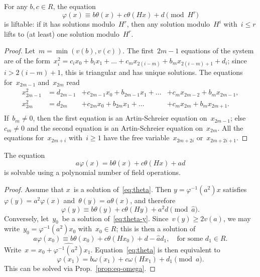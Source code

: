 \documentclass{llncs}
\begin{document}
\begin{proposition}\label{prop:eq-omega}
For any $b, c ∈ R$, the equation
\begin{equation}\label{eq:eq-omega}
φ(x) ≡ b θ(x) + c θ(Hx) + d \pmod{H^r}
\end{equation}
is liftable: if it has solutions modulo~$H^r$, then any solution
modulo~$H^i$ with~$i ≤ r$ lifts to (at least) one solution
modulo~$H^r$.
\end{proposition}


\begin{proof}
Let~$m = \min (v(b), v(c))$. The first~$2m-1$ equations of the system are
of the form~$x_i^2 = c_i x_0 + b_i x_1 + \dots + c_{m} x_{2(i-m)} +
b_m x_{2(i-m)+1} + d_i$; since~$i > 2(i-m)+1$, this is triangular and has
unique solutions. The equations for~$x_{2m-1}$ and~$x_{2m}$ read
\begin{equation}\label{eq:x2m}\begin{array}{llll}
x_{2m-1}^2 &= d_{2m-1} &+ c_{2m-1} x_0 + b_{2m-1} x_1 + \dots
  &+ c_{m} x_{2m-2} + b_{m} x_{2m-1},\\
x_{2m}^2 &= d_{2m} &+ c_{2m} x_0 + b_{2m} x_1 + \dots
  &+ c_{m} x_{2m} + b_{m} x_{2m+1}.\\
\end{array}\end{equation}
If~$b_m ≠ 0$, then the first equation is an Artin-Schreier equation
on~$x_{2m-1}$; else~$c_m ≠ 0$ and the second equation is an
Artin-Schreier equation on~$x_{2m}$. All the equations for~$x_{2m+i}$
with~$i ≥ 1$ have the free variable~$x_{2m+2i}$ or~$x_{2m+2i+1}$.
\end{proof}


\begin{proposition}\label{prop:eq}
The equation
\begin{equation}\label{eq:theta}
a φ(x) = b θ(x) + c θ(Hx) + ad
\end{equation}
is solvable using a polynomial number of field operations.
\end{proposition}

\begin{proof}
Assume that $x$~is a solution of~\eqref{eq:theta}. Then $y = φ^{-1}(a^2)
x$ satisfies~$φ(y) = a^2 φ(x)$ and~$θ(y) = a θ(x)$, and therefore
\begin{equation}\label{eq:theta-y}
φ(y) ≡ b θ(y) + c θ(Hy) + a^2d \pmod{\widehat{a}}.
\end{equation}
Conversely, let~$y_0$~be a solution of~\eqref{eq:theta-y}. Since~$v(y) ≥
2 v(a)$, we may write~$y_0 = φ^{-1}(a^2) x_0$ with~$x_0 ∈ R$; this is
then a solution of
\begin{equation}\label{eq:theta-x0}
a φ(x_0) ≡ b θ(x_0) + c θ(H x_0) + d - \widehat{a} d_1,\quad
\text{for some~$d_1 ∈ R$.}
\end{equation}
Write~$x = x_0 + \widehat{φ^{-1}(a^2)} x_1$. Equation~\eqref{eq:theta} is
then equivalent to
\begin{equation}\label{eq:omega-x1}
φ(x_1) = b ω(x_1) + c ω(H x_1) + d_1 \pmod{a}.
\end{equation}
This can be solved via Prop.~\ref{prop:eq-omega}.
\end{proof}
\end{document}
